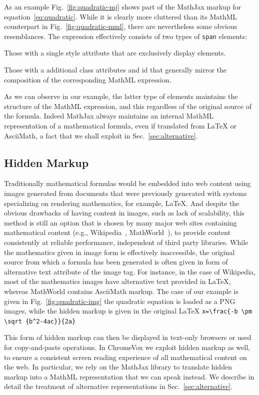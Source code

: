 \documentclass{sig-alternate}
\begin{document}
As an example Fig.~\ref{fig:quadratic-mj} shows part of the MathJax markup for
equation~\ref{eq:quadratic}. While it is clearly more cluttered than its MathML
counterpart in Fig.~\ref{fig:quadratic-mml}, there are nevertheless some obvious
resemblances. The expression effectively consists of two types of \texttt{span}
elements:
\begin{inparaenum}[(a)]
\item Those with a single style attribute that are exclusively display elements.
\item Those with a additional class attributes and id that generally mirror the
  composition of the corresponding MathML expression.
\end{inparaenum}
As we can observe in our example, the latter type of elements maintains the
structure of the MathML expression, and this regardless of the original source
of the formula. Indeed MathJax always maintains an internal MathML
representation of a mathematical formula, even if translated from {\LaTeX} or
AsciiMath, a fact that we shall exploit in Sec.~\ref{sec:alternative}.


\subsection{Hidden Markup}\label{sec:images}

Traditionally mathematical formulas would be embedded into web content using
images generated from documents that were previously generated with systems
specializing on rendering mathematics, for example, {\LaTeX}. And despite the
obvious drawbacks of having content in images, such as lack of scalability, this
method is still an option that is chosen by many major web sites containing
mathematical content (e.g., Wikipedia~\cite{wikipedia},
MathWorld~\cite{mathworld}), to provide content consistently at reliable
performance, independent of third party libraries.  While the mathematics given
in image form is effectively inaccessible, the original source from which a
formula has been generated is often given in form of alternative text attribute
of the image tag.  For instance, in the case of Wikipedia, most of the
mathematics images have alternative text provided in {\LaTeX}, whereas MathWorld
contains AsciiMath markup.  The case of our example is given in
Fig.~\ref{fig:quadratic-img} the quadratic equation is loaded as a PNG images,
while the hidden markup is given in the original {\LaTeX}
\verb+x=\frac{-b \pm \sqrt {b^2-4ac}}{2a}+


This form of hidden markup can then be displayed in
text-only browsers or used for copy-and-paste operations. 
In ChromeVox we exploit hidden markup as well, to ensure a consistent
screen reading experience of all mathematical content on the web.  In particular,
we rely on the MathJax library to translate hidden markup into a MathML
representation that we can speak instead. We describe in detail the treatment of
alternative representations in Sec.~\ref{sec:alternative}.
\end{document}
